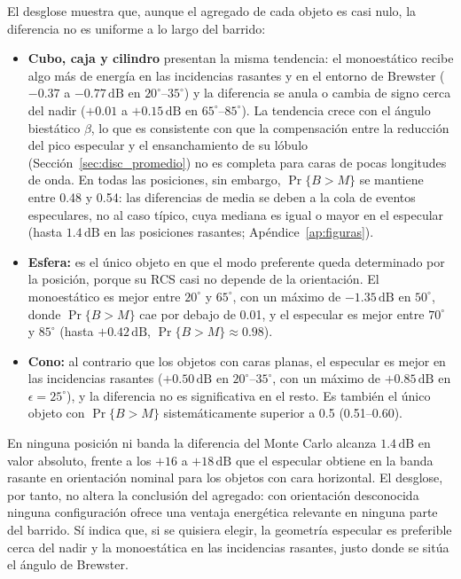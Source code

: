 \documentclass[11pt,a4paper]{report}
\newcommand{\dB}{\,\mathrm{dB}}
\begin{document}
El desglose muestra que, aunque el agregado de cada objeto es casi nulo, la
diferencia no es uniforme a lo largo del barrido:
\begin{itemize}[itemsep=2pt]
  \item \textbf{Cubo, caja y cilindro} presentan la misma tendencia: el
  monoestático recibe algo más de energía en las incidencias rasantes y en
  el entorno de Brewster ($-0.37$ a $-0.77\dB$ en $20^\circ$--$35^\circ$) y
  la diferencia se anula o cambia de signo cerca del nadir ($+0.01$ a
  $+0.15\dB$ en $65^\circ$--$85^\circ$). La tendencia crece con el ángulo
  biestático $\beta$, lo que es consistente con que la compensación entre la reducción
  del pico especular y el ensanchamiento de su lóbulo
  (Sección~\ref{sec:disc_promedio}) no es completa para caras de pocas
  longitudes de onda. En todas las posiciones, sin embargo,
  $\Pr\{B>M\}$ se mantiene entre 0.48 y 0.54: las diferencias de media se
  deben a la cola de eventos especulares, no al caso típico, cuya mediana es
  igual o mayor en el especular (hasta $1.4\dB$ en las posiciones rasantes;
  Apéndice~\ref{ap:figuras}).
  \item \textbf{Esfera:} es el único objeto en que el modo preferente queda
  determinado por la posición, porque su RCS casi no depende de la
  orientación. El monoestático es mejor entre $20^\circ$ y $65^\circ$, con
  un máximo de $-1.35\dB$ en $50^\circ$, donde $\Pr\{B>M\}$ cae por debajo
  de 0.01, y el especular es mejor entre $70^\circ$ y $85^\circ$ (hasta
  $+0.42\dB$, $\Pr\{B>M\}\approx0.98$).
  \item \textbf{Cono:} al contrario que los objetos con caras planas, el
  especular es mejor en las incidencias rasantes ($+0.50\dB$ en
  $20^\circ$--$35^\circ$, con un máximo de $+0.85\dB$ en $\epsilon=25^\circ$),
  y la diferencia no es significativa en el resto. Es también el único
  objeto con $\Pr\{B>M\}$ sistemáticamente superior a 0.5 (0.51--0.60).
\end{itemize}
En ninguna posición ni banda la diferencia del Monte Carlo alcanza
$1.4\dB$ en valor absoluto, frente a los $+16$ a $+18\dB$ que el
especular obtiene en la banda rasante en orientación nominal para los
objetos con cara horizontal. El desglose,
por tanto, no altera la conclusión del agregado: con orientación
desconocida ninguna configuración ofrece una ventaja energética relevante
en ninguna parte del barrido. Sí indica que, si se quisiera elegir, la
geometría especular es preferible cerca del nadir y la monoestática en las
incidencias rasantes, justo donde se sitúa el ángulo de Brewster.
\end{document}
